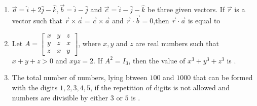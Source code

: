 \documentclass[journal,12pt,onecolumn]{IEEEtran}
\theoremstyle{remark}
\begin{document}
\begin{enumerate}
	\item $\vec{a}=\hat{i}+2\hat{j}-\hat{k},\vec{b}=\hat{i}-\hat{j}$ and $\vec{c}=\hat{i}-\hat{j}-\hat{k}$ be three given vectors. If $\vec{r}$ is a vector such that $\vec{r}\times\vec{a}=\vec{c}\times\vec{a}$ and $\vec{r}\cdot\vec{b}=0$,then $\vec{r}\cdot\vec{a}$ is equal to \\

	\item Let $A=\begin{bmatrix}
			x & y & z \\
			y & z & x \\
			z & x & y 
	\end{bmatrix}$, where $x, y$ and $z$ are real numbers such that $x+y+z>0$ and $xyz=2$. If $A^2=I_3$, then the value of $x^3+y^3+z^3$ is .\\

        \item The total number of numbers, lying btween $100$ and $1000$ that can be formed with the digits $1, 2, 3, 4, 5$, if the repetition of digits is not allowed and numbers are divisible by either $3$ or $5$ is . 


\end{enumerate}
\end{document}
